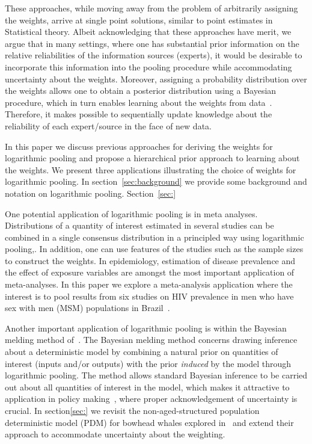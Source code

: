 \documentclass[a4paper, notitlepage, 10pt]{article}
\begin{document}
These approaches, while moving away from the problem of arbitrarily assigning the weights, arrive at single point solutions, similar to point estimates in Statistical theory.
Albeit acknowledging that these approaches have merit, we argue that in many settings, where one has substantial prior information on the relative reliabilities of the information sources (experts), it would be desirable to incorporate this information into the pooling procedure while accommodating uncertainty about the weights.
Moreover, assigning a probability distribution over the weights allows one to obtain a posterior distribution using a Bayesian procedure, which in turn enables learning about the weights from data~\citep{poole2000}.
Therefore, it makes possible to sequentially update knowledge about the reliability of each expert/source in the face of new data.

In this paper we discuss previous approaches for deriving the weights for logarithmic pooling and propose a hierarchical prior approach to learning about the weights.
We present three applications illustrating the choice of weights for logarithmic pooling. %
In section~\ref{sec:background} we provide some background and notation on logarithmic pooling.
Section~\ref{sec:}

One potential application of logarithmic pooling is in meta analyses.
Distributions of a quantity of interest estimated in several studies can be combined in a single consensus distribution in a principled way using logarithmic pooling,.
In addition, one can use features of the studies such as the sample sizes to construct the weights.
In epidemiology, estimation of disease prevalence and the effect of exposure variables are amongst the most important application of meta-analyses.
In this paper we explore a meta-analysis application where the interest is to pool results from six studies on HIV prevalence  in men who have sex with men (MSM) populations in Brazil~\citep{malta2010hiv}.

Another important application of logarithmic pooling is within the Bayesian melding method of~\cite{poole2000}. 
The Bayesian melding method concerns drawing inference about a deterministic model by combining a natural prior on quantities of interest (inputs and/or outputs) with the prior \textit{induced} by the model through logarithmic pooling.
The method allows standard Bayesian inference to be carried out about all quantities of interest in the model, which makes it attractive to application in policy making~\citep{alkema2008}, where proper acknowledgement of uncertainty is crucial.
In section\ref{sec:} we revisit the non-aged-structured population deterministic model (PDM) for bowhead whales explored in~\cite{poole2000} and extend their approach to accommodate uncertainty about the weighting.
\end{document}
